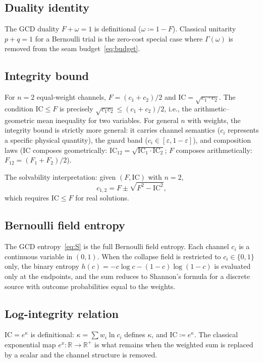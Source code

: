 \documentclass[
  aps,
  prd,
  twocolumn,
  superscriptaddress,
  nofootinbib,
  floatfix
]{revtex4-2}
\newcommand{\Gam}{\Gamma}
\newcommand{\eps}{\varepsilon}
\newcommand{\beq}{\begin{equation}}
\newcommand{\eeq}{\end{equation}}
\newcommand{\IC}{\mathrm{IC}}
\begin{document}
\subsection{Duality identity}

The GCD duality $F + \omega = 1$ is definitional ($\omega \coloneqq
1 - F$).  Classical unitarity $p + q = 1$ for a Bernoulli trial is
the zero-cost special case where $\Gam(\omega)$ is removed from the
seam budget~\eqref{eq:budget}.

\subsection{Integrity bound}

For $n = 2$ equal-weight channels, $F = (c_1 + c_2)/2$ and
$\IC = \sqrt{c_1 \cdot c_2}$.  The condition $\IC \leq F$ is
precisely $\sqrt{c_1 c_2} \leq (c_1 + c_2)/2$, i.e., the
arithmetic--geometric mean inequality for two variables.  For
general $n$ with weights, the integrity bound is strictly more
general: it carries channel semantics ($c_i$ represents a specific
physical quantity), the guard band ($c_i \in [\eps, 1-\eps]$), and
composition laws ($\IC$ composes geometrically:
$\IC_{12} = \sqrt{\IC_1 \cdot \IC_2}$; $F$ composes arithmetically:
$F_{12} = (F_1 + F_2)/2$).

The solvability interpretation: given $(F, \IC)$ with $n = 2$,
\beq
  c_{1,2} = F \pm \sqrt{F^2 - \IC^2},
\eeq
which requires $\IC \leq F$ for real solutions.

\subsection{Bernoulli field entropy}

The GCD entropy~\eqref{eq:S} is the full Bernoulli field entropy.
Each channel $c_i$ is a continuous variable in $(0, 1)$.  When the
collapse field is restricted to $c_i \in \{0, 1\}$ only, the binary
entropy $h(c) = -c\log c - (1-c)\log(1-c)$ is evaluated only at the
endpoints, and the sum reduces to Shannon's formula for a discrete
source with outcome probabilities equal to the weights.

\subsection{Log-integrity relation}

$\IC = e^\kappa$ is definitional: $\kappa = \sum w_i \ln c_i$
defines $\kappa$, and $\IC \coloneqq e^\kappa$.  The classical
exponential map $e^x: \mathbb{R} \to \mathbb{R}^+$ is what remains
when the weighted sum is replaced by a scalar and the channel
structure is removed.



\end{document}
